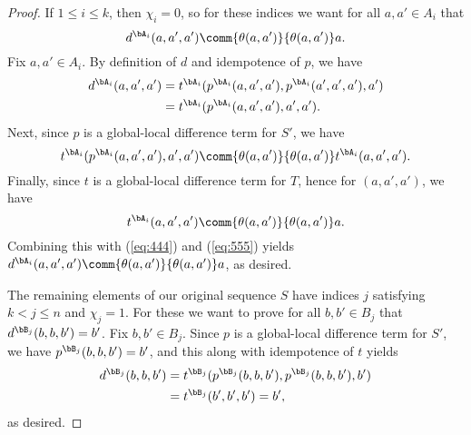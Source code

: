 \begin{proof}
If $1\leq i \leq k$, then $\chi_i =0$, so for these indices we want
for all $a, a' \in A_i$ that
\[
d^{\bA_i}(a,a',a') \comm{\theta(a,a')}{\theta(a,a')} a.
\]
Fix $a, a'\in A_i$.
By definition of $d$ and idempotence of $p$, we have
\begin{align}
  d^{\bA_i}(a,a',a') &=
  t^{\bA_i}(p^{\bA_i}(a,a',a'), p^{\bA_i}(a',a',a'), a')   \label{eq:444}\\
  &=t^{\bA_i}(p^{\bA_i}(a,a',a'), a', a'). \nonumber
\end{align}
Next, since $p$ is a global-local difference term for $S'$, we have
\begin{equation}
  \label{eq:555}
  t^{\bA_i}(p^{\bA_i}(a,a',a'), a', a')
 \comm{\theta(a,a')}{\theta(a,a')}
 t^{\bA_i}(a, a', a').
\end{equation}
Finally, since $t$ is a global-local difference term for $T$, hence for
$(a, a', a')$,  %
we have 
\[
t^{\bA_i}(a, a', a') \comm{\theta(a,a')}{\theta(a,a')} a.
\]
Combining this with (\ref{eq:444}) and (\ref{eq:555}) yields
$d^{\bA_i}(a,a',a') \comm{\theta(a,a')}{\theta(a,a')} a$,
as desired.

The remaining elements of our original sequence $S$
have indices $j$ satisfying $k<j\leq n$ and $\chi_j = 1$.
For these we want to prove for all $b, b'\in B_j$ that $d^{\bB_j}(b,b,b') = b'$.
Fix $b, b'\in B_j$. Since $p$ is a global-local difference term for $S'$, we have
$p^{\bB_j}(b,b,b') = b'$, and this along with idempotence of $t$ yields
\begin{align*}
d^{\bB_j}(b,b,b') &=
t^{\bB_j}(p^{\bB_j}(b,b,b'), p^{\bB_j}(b,b,b'), b')\\
&=t^{\bB_j}(b', b', b') =b',
\end{align*}
as desired.
\end{proof}
